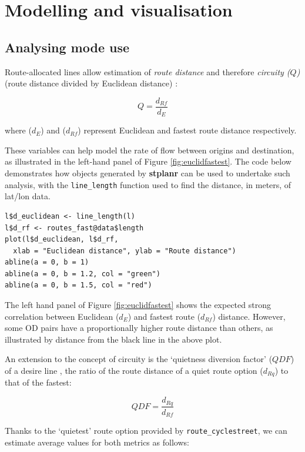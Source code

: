\section{Modelling and visualisation}\label{modelling-and-visualisation}

\subsection{Analysing mode use}\label{modelling-mode-choice}

Route-allocated lines allow estimation of \emph{route distance} and therefore
\emph{circuity ($Q$)} (route distance divided by Euclidean distance)
\citep{levinson_minimum_2009}:

\[
 Q = \frac{d_{Rf}}{d_E}
\]

where (\(d_E\)) and (\(d_{Rf}\)) represent
Euclidean and fastest route distance respectively.

These
variables can help model the rate of flow between origins and
destination, as illustrated in the left-hand panel of Figure
\ref{fig:euclidfastest}. The code below demonstrates how objects
generated by \textbf{stplanr} can be used to undertake such analysis,
with the \texttt{line\_length} function used to find the distance, in
meters, of lat/lon data.

\begin{verbatim}
l$d_euclidean <- line_length(l)
l$d_rf <- routes_fast@data$length
plot(l$d_euclidean, l$d_rf,
  xlab = "Euclidean distance", ylab = "Route distance")
abline(a = 0, b = 1)
abline(a = 0, b = 1.2, col = "green")
abline(a = 0, b = 1.5, col = "red")
\end{verbatim}

The left hand panel of Figure \ref{fig:euclidfastest} shows the expected
strong correlation between Euclidean (\(d_E\)) and fastest route
(\(d_{Rf}\)) distance. However, some OD pairs have a proportionally
higher route distance than others, as illustrated by distance from the
black line in the above plot.

An extension to the concept of circuity is the `quietness diversion
factor' (\(QDF\)) of a desire line \citep{lovelace_propensity_2017}, the
ratio of the route distance of a quiet route option (\(d_{Rq}\)) to that
of the fastest:

\[
 QDF = \frac{d_{Rq}}{d_{Rf}}
\]

Thanks to the `quietest' route option provided by
\texttt{route\_cyclestreet}, we can estimate average values for both
metrics as follows:

